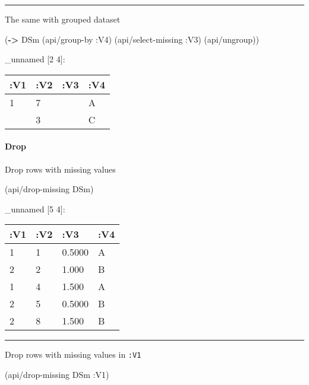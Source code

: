 \documentclass[]{article}
\newenvironment{Shaded}{\begin{snugshade}}{\end{snugshade}}
\newcommand{\KeywordTok}[1]{\textcolor[rgb]{0.13,0.29,0.53}{\textbf{#1}}}
\newcommand{\AttributeTok}[1]{\textcolor[rgb]{0.77,0.63,0.00}{#1}}
\newcommand{\NormalTok}[1]{#1}
\let\oldparagraph\paragraph
\renewcommand{\paragraph}[1]{\oldparagraph{#1}\mbox{}}
\begin{document}
\begin{center}\rule{0.5\linewidth}{0.5pt}\end{center}

The same with grouped dataset

\begin{Shaded}
\begin{Highlighting}[]
\NormalTok{(}\KeywordTok{->}\NormalTok{ DSm}
\NormalTok{    (api/group-by }\AttributeTok{:V4}\NormalTok{)}
\NormalTok{    (api/select-missing }\AttributeTok{:V3}\NormalTok{)}
\NormalTok{    (api/ungroup))}
\end{Highlighting}
\end{Shaded}

\_unnamed {[}2 4{]}:

\begin{longtable}[]{@{}llll@{}}
\toprule
:V1 & :V2 & :V3 & :V4\tabularnewline
\midrule
\endhead
1 & 7 & & A\tabularnewline
& 3 & & C\tabularnewline
\bottomrule
\end{longtable}

\paragraph{Drop}\label{drop-2}

Drop rows with missing values

\begin{Shaded}
\begin{Highlighting}[]
\NormalTok{(api/drop-missing DSm)}
\end{Highlighting}
\end{Shaded}

\_unnamed {[}5 4{]}:

\begin{longtable}[]{@{}llll@{}}
\toprule
:V1 & :V2 & :V3 & :V4\tabularnewline
\midrule
\endhead
1 & 1 & 0.5000 & A\tabularnewline
2 & 2 & 1.000 & B\tabularnewline
1 & 4 & 1.500 & A\tabularnewline
2 & 5 & 0.5000 & B\tabularnewline
2 & 8 & 1.500 & B\tabularnewline
\bottomrule
\end{longtable}

\begin{center}\rule{0.5\linewidth}{0.5pt}\end{center}

Drop rows with missing values in \texttt{:V1}

\begin{Shaded}
\begin{Highlighting}[]
\NormalTok{(api/drop-missing DSm }\AttributeTok{:V1}\NormalTok{)}
\end{Highlighting}
\end{Shaded}
\end{document}
